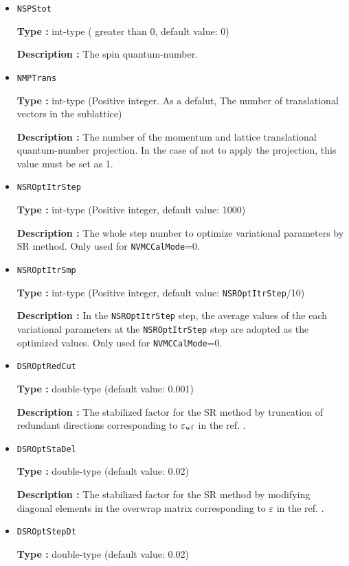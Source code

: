 \begin{itemize}
 \item  \verb|NSPStot|

{\bf Type :} int-type ( greater than 0,  default value: 0)

{\bf Description :}   The spin quantum-number. 

\item  \verb|NMPTrans|

  {\bf Type :} int-type (Positive integer.
  As a defalut, The number of translational vectors in the sublattice)

  {\bf Description :} 
  The number of the momentum and lattice translational quantum-number projection.
  In the case of not to apply the projection, this value must be set as 1.

 \item  \verb|NSROptItrStep|

{\bf Type :} int-type (Positive integer, default value: 1000)

{\bf Description :} 
The whole step number to optimize variational parameters by SR method. Only used for \verb|NVMCCalMode|=0.
 
 \item  \verb|NSROptItrSmp|

{\bf Type :} int-type (Positive integer, default value: \verb|NSROptItrStep|/10)

{\bf Description :} In the \verb|NSROptItrStep| step, the average values of the each variational parameters at the \verb|NSROptItrStep| step are adopted as the optimized values. Only used for \verb|NVMCCalMode|=0.

\item   \verb|DSROptRedCut|
   
{\bf Type :} double-type (default value: 0.001)

{\bf Description :} The stabilized factor for the SR method by truncation of redundant directions corresponding to $\varepsilon_{\rm wf}$ in the ref. \cite{Tahara2008}.

 \item  \verb|DSROptStaDel| 
   
 {\bf Type :} double-type (default value: 0.02)

  {\bf Description :} The stabilized factor for the SR method by modifying diagonal elements in the overwrap matrix corresponding to $\varepsilon$ in the ref. \cite{Tahara2008}.
     
\item \verb|DSROptStepDt|

{\bf Type :} double-type (default value: 0.02)


\end{itemize}
